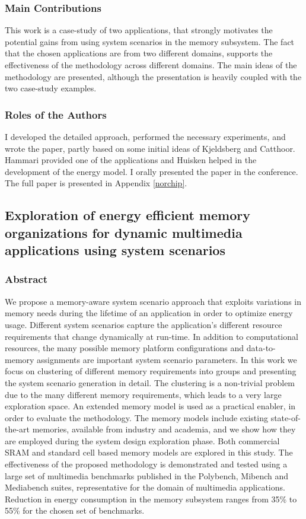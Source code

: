 \subsubsection{Main Contributions}

This work is a case-study of two applications, that strongly motivates the potential gains from using system scenarios in the memory subsystem.
The fact that the chosen applications are from two different domains, supports the effectiveness of the methodology across different domains.
The main ideas of the methodology are presented, although the presentation is heavily coupled with the two case-study examples.

\subsubsection{Roles of the Authors}

I developed the detailed approach, performed the necessary experiments, and wrote the paper, partly based on some initial ideas of Kjeldsberg and Catthoor. 
Hammari provided one of the applications and Huisken helped in the development of the energy model.
I orally presented the paper in the conference.
The full paper is presented in Appendix \ref{norchip}.

\subsection{Exploration of energy efficient memory organizations for dynamic multimedia applications using system scenarios}

\subsubsection{Abstract}

We propose a memory-aware system scenario approach that exploits variations in memory needs during the lifetime of an application in order to optimize energy usage. 
Different system scenarios capture the application's different resource requirements that change dynamically at run-time. 
In addition to computational resources, the many possible memory platform configurations and data-to-memory assignments are important system scenario parameters. 
In this work we focus on clustering of different memory requirements into groups and presenting the system scenario generation in detail.
The clustering is a non-trivial problem due to the many different memory requirements, which leads to a very large exploration space.
An extended memory model is used as a practical enabler, in order to evaluate the methodology. 
The memory models include existing state-of-the-art memories, available from industry and academia, and we show how they are employed during the system design exploration phase. 
Both commercial SRAM and standard cell based memory models are explored in this study. 
The effectiveness of the proposed methodology is demonstrated and tested using a large set of multimedia benchmarks published in the Polybench, Mibench and Mediabench suites,
representative for the domain of multimedia applications.
Reduction in energy consumption in the memory subsystem ranges from 35\% to 55\% for the chosen set of benchmarks.

